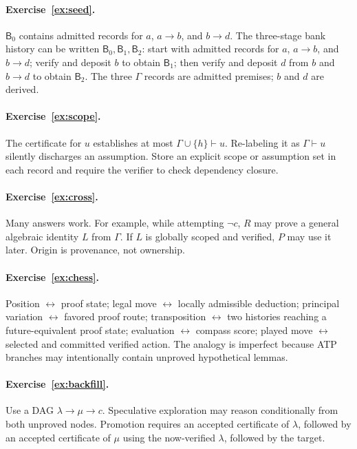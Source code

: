 \documentclass[11pt,openany]{book}
\theoremstyle{definition}
\theoremstyle{remark}
\newcommand{\Bank}{\mathsf{B}}
\begin{document}
\paragraph{Exercise~\ref{ex:seed}.}
$\Bank_0$ contains admitted records for $a$, $a\to b$, and $b\to d$. The three-stage bank history can be written $\Bank_0,\Bank_1,\Bank_2$: start with admitted records for $a$, $a\to b$, and $b\to d$; verify and deposit $b$ to obtain $\Bank_1$; then verify and deposit $d$ from $b$ and $b\to d$ to obtain $\Bank_2$. The three $\Gamma$ records are admitted premises; $b$ and $d$ are derived.

\paragraph{Exercise~\ref{ex:scope}.}
The certificate for $u$ establishes at most $\Gamma\cup\{h\}\vdash u$. Re-labeling it as $\Gamma\vdash u$ silently discharges an assumption. Store an explicit scope or assumption set in each record and require the verifier to check dependency closure.

\paragraph{Exercise~\ref{ex:cross}.}
Many answers work. For example, while attempting $\neg c$, $R$ may prove a general algebraic identity $L$ from $\Gamma$. If $L$ is globally scoped and verified, $P$ may use it later. Origin is provenance, not ownership.

\paragraph{Exercise~\ref{ex:chess}.}
Position $\leftrightarrow$ proof state; legal move $\leftrightarrow$ locally admissible deduction; principal variation $\leftrightarrow$ favored proof route; transposition $\leftrightarrow$ two histories reaching a future-equivalent proof state; evaluation $\leftrightarrow$ compass score; played move $\leftrightarrow$ selected and committed verified action. The analogy is imperfect because ATP branches may intentionally contain unproved hypothetical lemmas.

\paragraph{Exercise~\ref{ex:backfill}.}
Use a DAG $\lambda\to\mu\to c$. Speculative exploration may reason conditionally from both unproved nodes. Promotion requires an accepted certificate of $\lambda$, followed by an accepted certificate of $\mu$ using the now-verified $\lambda$, followed by the target.
\end{document}

